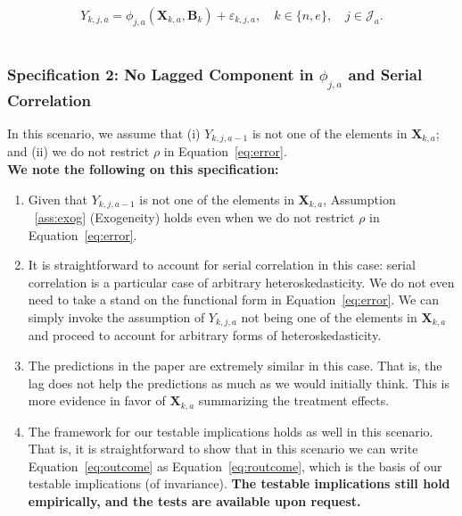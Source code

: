 \begin{equation}\label{eq:routcome}
Y_{k,j,a} = \phi_{j,a} (\bm{X}_{k,a}, \bm{B}_k) + \varepsilon_{k,j,a}, \quad k \in \{n,e\}, \quad j \in \mathcal{J}_a.
\end{equation}\\

\subsubsection{Specification 2: No Lagged Component in $\phi_{j,a}$ and Serial Correlation}

\noindent In this scenario, we assume that (i)  $Y_{k,j,a-1}$ is not one of the elements in $\bm{X}_{k,a}$; and (ii) we do not restrict $\rho$ in Equation~\eqref{eq:error}.\\

\noindent \textbf{We note the following on this specification:}

\begin{enumerate}

\item Given that $Y_{k,j,a-1}$ is not one of the elements in $\bm{X}_{k,a}$, Assumption ~\ref{ass:exog} (Exogeneity) holds even when we do not restrict $\rho$ in Equation~\eqref{eq:error}. 

\item It is straightforward to account for serial correlation in this case: serial correlation is a particular case of arbitrary heteroskedasticity. We do not even need to take a stand on the functional form in Equation~\eqref{eq:error}. We can simply invoke the assumption of $Y_{k,j,a}$ not being one of the elements in $\bm{X}_{k,a}$ and proceed to account for arbitrary forms of heteroskedasticity. 

\item The predictions in the paper are extremely similar in this case. That is, the lag does not help the predictions as much as we would initially think. This is more evidence in favor of $\bm{X}_{k,a}$ summarizing the treatment effects.

\item The framework for our testable implications holds as well in this scenario. That is, it is straightforward to show that in this scenario we can write Equation~\eqref{eq:outcome} as Equation~\eqref{eq:routcome}, which is the basis of our testable implications (of invariance). \textbf{The testable implications still hold empirically, and the tests are available upon request.}

\end{enumerate}

